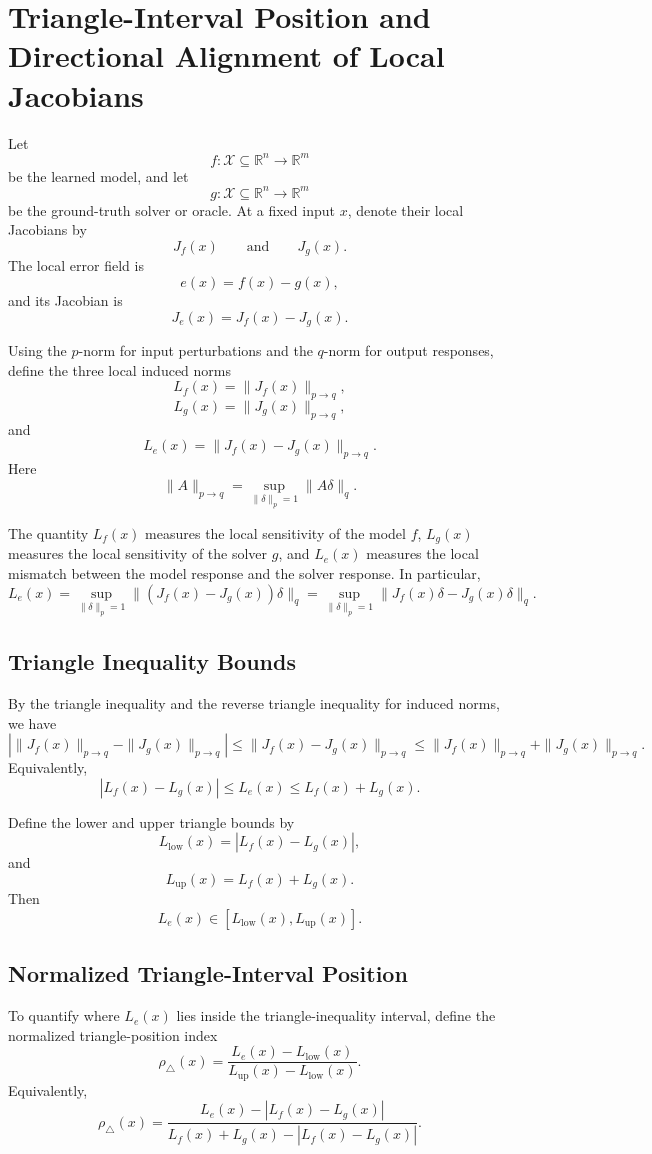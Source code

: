 \documentclass{article}
\begin{document}
\section{Triangle-Interval Position and Directional Alignment of Local Jacobians}

Let
\[
f:\mathcal X\subseteq \mathbb R^n\to \mathbb R^m
\]
be the learned model, and let
\[
g:\mathcal X\subseteq \mathbb R^n\to \mathbb R^m
\]
be the ground-truth solver or oracle. At a fixed input \(x\), denote their local Jacobians by
\[
J_f(x)
\qquad\text{and}\qquad
J_g(x).
\]
The local error field is
\[
e(x)=f(x)-g(x),
\]
and its Jacobian is
\[
J_e(x)=J_f(x)-J_g(x).
\]

Using the \(p\)-norm for input perturbations and the \(q\)-norm for output responses, define the three local induced norms
\[
L_f(x)=\|J_f(x)\|_{p\to q},
\]
\[
L_g(x)=\|J_g(x)\|_{p\to q},
\]
and
\[
L_e(x)=\|J_f(x)-J_g(x)\|_{p\to q}.
\]
Here
\[
\|A\|_{p\to q}
=
\sup_{\|\delta\|_p=1}
\|A\delta\|_q.
\]

The quantity \(L_f(x)\) measures the local sensitivity of the model \(f\), \(L_g(x)\) measures the local sensitivity of the solver \(g\), and \(L_e(x)\) measures the local mismatch between the model response and the solver response. In particular,
\[
L_e(x)
=
\sup_{\|\delta\|_p=1}
\|(J_f(x)-J_g(x))\delta\|_q
=
\sup_{\|\delta\|_p=1}
\|J_f(x)\delta-J_g(x)\delta\|_q.
\]

\subsection{Triangle Inequality Bounds}

By the triangle inequality and the reverse triangle inequality for induced norms, we have
\[
\left|
\|J_f(x)\|_{p\to q}
-
\|J_g(x)\|_{p\to q}
\right|
\le
\|J_f(x)-J_g(x)\|_{p\to q}
\le
\|J_f(x)\|_{p\to q}
+
\|J_g(x)\|_{p\to q}.
\]
Equivalently,
\[
\boxed{
|L_f(x)-L_g(x)|
\le
L_e(x)
\le
L_f(x)+L_g(x)
}.
\]

Define the lower and upper triangle bounds by
\[
L_{\mathrm{low}}(x)
=
|L_f(x)-L_g(x)|,
\]
and
\[
L_{\mathrm{up}}(x)
=
L_f(x)+L_g(x).
\]
Then
\[
L_e(x)\in
\left[
L_{\mathrm{low}}(x),
L_{\mathrm{up}}(x)
\right].
\]

\subsection{Normalized Triangle-Interval Position}

To quantify where \(L_e(x)\) lies inside the triangle-inequality interval, define the normalized triangle-position index
\[
\rho_{\triangle}(x)
=
\frac{
L_e(x)-L_{\mathrm{low}}(x)
}{
L_{\mathrm{up}}(x)-L_{\mathrm{low}}(x)
}.
\]
Equivalently,
\[
\rho_{\triangle}(x)
=
\frac{
L_e(x)-|L_f(x)-L_g(x)|
}{
L_f(x)+L_g(x)-|L_f(x)-L_g(x)|
}.
\]
\end{document}
